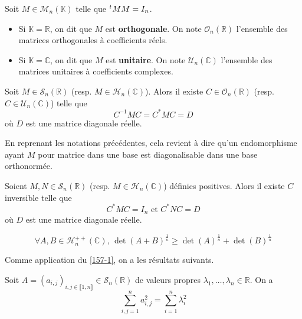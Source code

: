   
  \begin{definition}
    Soit $M \in \mathcal{M}_n(\mathbb{K})$ telle que $\mathstrut ^t MM = I_n$.
    \begin{itemize}
      \item Si $\mathbb{K} = \mathbb{R}$, on dit que $M$ est \textbf{orthogonale}. On note $\mathcal{O}_n(\mathbb{R})$ l'ensemble des matrices orthogonales à coefficients réels.
      \item Si $\mathbb{K} = \mathbb{C}$, on dit que $M$ est \textbf{unitaire}. On note $\mathcal{U}_n(\mathbb{C})$ l'ensemble des matrices unitaires à coefficients complexes.
    \end{itemize}
  \end{definition}
  
  \begin{theorem}[Spectral]
    \label{157-1}
    Soit $M \in \mathcal{S}_n(\mathbb{R})$ (resp. $M \in \mathcal{H}_n(\mathbb{C})$). Alors il existe $C \in \mathcal{O}_n(\mathbb{R})$ (resp. $C \in \mathcal{U}_n(\mathbb{C})$) telle que
    \[ C^{-1}MC = C^* M C = D \]
    où $D$ est une matrice diagonale réelle.
  \end{theorem}
  
  \begin{remark}
    En reprenant les notations précédentes, cela revient à dire qu'un endomorphisme ayant $M$ pour matrice dans une base est diagonalisable dans une base orthonormée.
  \end{remark}
  
  \begin{corollary}
    Soient $M, N \in \mathcal{S}_n(\mathbb{R})$ (resp. $M \in \mathcal{H}_n(\mathbb{C})$) définies positives. Alors il existe $C$ inversible telle que
    \[ C^*MC = I_n \text{ et } C^*NC = D \]
    où $D$ est une matrice diagonale réelle.
  \end{corollary}
  
  
  \begin{application}
    \[ \forall A, B \in \mathcal{H}_n^{++}(\mathbb{C}), \, \det(A+B)^{\frac{1}{n}} \geq \det(A)^{\frac{1}{n}} + \det(B)^{\frac{1}{n}} \]
  \end{application}
  
  
  Comme application du \cref{157-1}, on a les résultats suivants.
  
  \begin{application}
    Soit $A = (a_{i,j})_{i,j \in \llbracket 1, n \rrbracket} \in \mathcal{S}_n(\mathbb{R})$ de valeurs propres $\lambda_1, \dots, \lambda_n \in \mathbb{R}$. On a
    \[ \sum_{i,j = 1}^n a_{i,j}^2 = \sum_{i=1}^n \lambda_i^2 \]
  \end{application}
  
